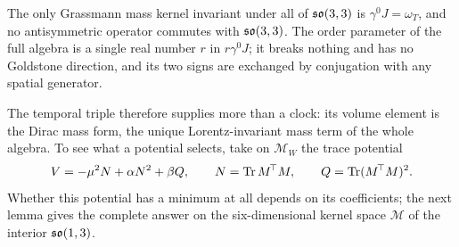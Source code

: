 \begin{corollary}
\label{cor:fullmass}
The only Grassmann mass kernel invariant under all of $\mathfrak{so}(3,3)$ is $\gamma^0J=\omega_T$, and no antisymmetric operator commutes with
$\mathfrak{so}(3,3)$. The order parameter of the full algebra is a single real number $r$ in $r\gamma^0J$; it breaks nothing and has no Goldstone
direction, and its two signs are exchanged by conjugation with any spatial generator.
\end{corollary}

The temporal triple therefore supplies more than a clock: its volume element is the Dirac mass form, the unique Lorentz-invariant mass term
of the whole algebra. To see what a potential selects, take on $\mathcal M_W$ the trace potential
\begin{equation}
\label{eq:tracepot1}
V=-\mu^2N+\alpha N^2+\beta Q,\qquad N=\operatorname{Tr} M^{\!\top}M,\qquad Q=\operatorname{Tr}(M^{\!\top}M)^2 .
\end{equation}
Whether this potential has a minimum at all depends on its coefficients; the next lemma gives the complete answer on the
six-dimensional kernel space $\mathcal M$ of the interior $\mathfrak{so}(1,3)$.

